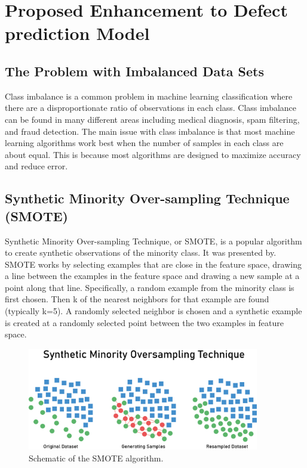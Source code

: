 \documentclass[12pt]{report}
\begin{document}
\chapter*{Proposed Enhancement to Defect prediction Model}

\section*{The Problem with Imbalanced Data Sets}
Class imbalance is a common problem in machine learning classification where there are a disproportionate ratio of observations in each class. Class imbalance can be found in many different areas including medical diagnosis, spam filtering, and fraud detection. The main issue with class imbalance is that most machine learning algorithms work best when the number of samples in each class are about equal. This is because most algorithms are designed to maximize accuracy and reduce error.

\section*{Synthetic Minority Over-sampling Technique (SMOTE)}

Synthetic Minority Over-sampling Technique, or SMOTE, is a popular algorithm to
create synthetic observations of the minority class. It was presented
by\cite{chawla2002smote}.\\

\newpage
SMOTE works by selecting examples that are close in the feature space, drawing a line between the examples in the feature space and drawing a new sample at a point along that line. Specifically, a random example from the minority class is first chosen. Then k of the nearest neighbors for that example are found (typically k=5). A randomly selected neighbor is chosen and a synthetic example is created at a randomly selected point between the two examples in feature space.

\begin{figure}[hbt!]
      \centering
      \includegraphics[width=0.9\textwidth]{./figures/smote.png}
      \caption{Schematic of the SMOTE algorithm.}
      \label{fig:SMOTE}
\end{figure}
\end{document}
